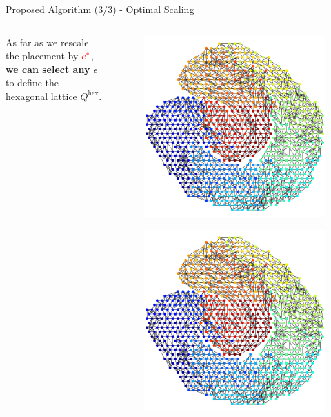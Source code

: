 \documentclass[dvipdfmx,13pt,aspectratio=169]{beamer}
\newcommand{\red}[1]{\textcolor{red}{#1}}
\begin{document}
\begin{frame}{Proposed Algorithm (3/3) - Optimal Scaling}
\begin{columns}
\begin{column}{0.75\columnwidth}
      As far as we rescale the placement by $\red{c^*}$,\\
      \textbf{we can select any $\epsilon$} to define the hexagonal lattice $Q^\mathrm{hex}$.
    \end{column}
    \begin{column}{0.25\columnwidth}
      \vspace{-0.5cm}
      \begin{figure}[t]
        \centering
        \includegraphics[width=0.2\columnwidth]{../main/individual/vis/fig1_init_CN.png}\\
        \includegraphics[width=0.8\columnwidth]{../main/individual/vis/fig1_init_CN.png}\\

\end{figure}
\end{column}
\end{columns}
\end{frame}
\end{document}
